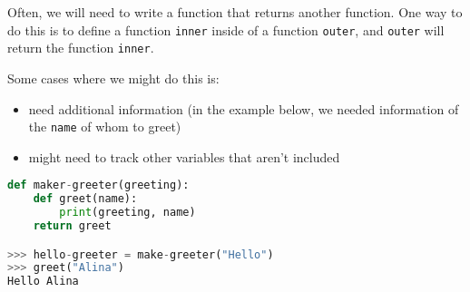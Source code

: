 Often, we will need to write a function that returns another function. One way
to do this is to define a function \texttt{inner} inside of a function \texttt{outer}, and \texttt{outer} will return the function \texttt{inner}. 

Some cases where we might do this is:
\begin{itemize}
    \item need additional information (in the example below, we needed information of the \texttt{name} of whom to greet)
    \item might need to track other variables that aren't included
\end{itemize}
\vspace{2mm}

\begin{lstlisting}[language = Python]
def maker-greeter(greeting):
    def greet(name):
        print(greeting, name)
    return greet

>>> hello-greeter = make-greeter("Hello")
>>> greet("Alina")
Hello Alina
\end{lstlisting}






